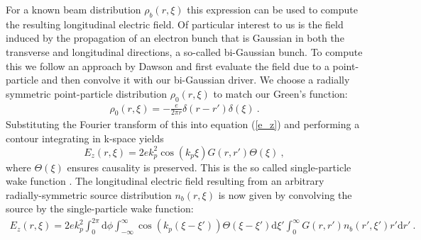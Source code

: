 For a known beam distribution $\rho_b(r,\xi)$ this expression can be used to compute the resulting longitudinal electric field. Of particular interest to us is the field induced by the propagation of an electron bunch that is Gaussian in both the transverse and longitudinal directions, a so-called bi-Gaussian bunch. To compute this we follow an approach by Dawson \cite{Katsouleas1987} and first evaluate the field due to a point-particle and then convolve it with our bi-Gaussian driver. We choose a radially symmetric point-particle distribution ${\rho}_{0}(r,\xi)$ to match our Green's function:
\begin{align}
{\rho}_{0}(r,\xi)=-\frac{e}{2\pi r}\delta(r-r')\delta(\xi)~. %
\end{align}
Substituting the Fourier transform of this into equation (\ref{e_z}) and performing a contour integrating in k-space yields 
\begin{equation}
E_z(r,\xi)=2ek_p^2\cos(k_p\xi)G\left(r,r'\right)\Theta(\xi)~,
\label{singe-particle-wake}
\end{equation}
where $\Theta(\xi)$ ensures causality is preserved. This is the so called single-particle wake function \cite{Katsouleas1987}. The longitudinal electric field resulting from an arbitrary radially-symmetric source distribution $n_b(r,\xi)$ is now given by convolving the source by the single-particle wake function:
\begin{align}
E_z(r,\xi)=2ek_p^2\int_0^{2\pi}\mathrm{d}\phi  \int_{-\infty}^{\infty} \cos(k_p(\xi-\xi'))\Theta(\xi-\xi')\mathrm{d}\xi' \int_{0}^{\infty}G\left(r,r'\right) n_b(r',\xi')r'\mathrm{d}r'~.
\end{align}
